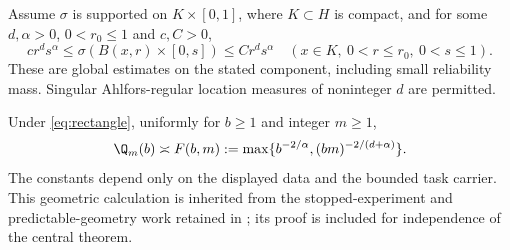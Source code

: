 Assume $\sigma$ is supported on $K\times[0,1]$, where $K\subset H$ is compact, and for some $d,\alpha>0$, $0<r_0\le1$ and $c,C>0$,
\begin{equation}\label{eq:rectangle}
 c r^d s^\alpha\le\sigma(B(x,r)\times[0,s])\le C r^d s^\alpha
 \quad(x\in K,\ 0<r\le r_0,\ 0<s\le1).
\end{equation}
These are global estimates on the stated component, including small reliability mass. Singular Ahlfors-regular location measures of noninteger $d$ are permitted.

\begin{proposition}\label{prop:regular}
Under \eqref{eq:rectangle}, uniformly for $b\ge1$ and integer $m\ge1$,
\begin{equation}\label{eq:F}
 \Q_m(b)\asymp F(b,m):=
 \max\{b^{-2/\alpha},(bm)^{-2/(d+\alpha)}\}.
\end{equation}
The constants depend only on the displayed data and the bounded task carrier. This geometric calculation is inherited from the stopped-experiment and predictable-geometry work retained in \cite{Companion}; its proof is included for independence of the central theorem.
\end{proposition}
